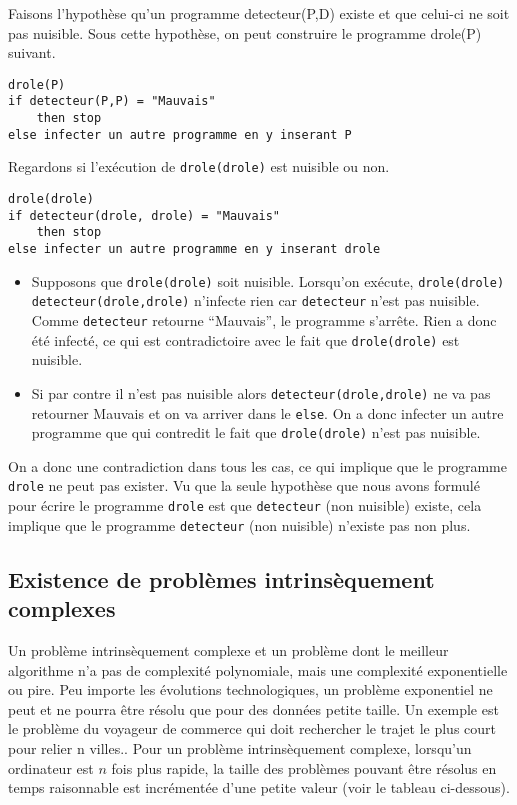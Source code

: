 Faisons l'hypothèse qu'un programme detecteur(P,D) existe et que celui-ci ne soit pas nuisible.  Sous cette hypothèse, on peut construire le programme  drole(P) suivant.

\label{lst:detecteur_de_virus}
\begin{lstlisting}
drole(P)
if detecteur(P,P) = "Mauvais"
	then stop
else infecter un autre programme en y inserant P
\end{lstlisting}

Regardons si l'exécution de \lstinline|drole(drole)| est nuisible ou non.  
\begin{lstlisting}
drole(drole)
if detecteur(drole, drole) = "Mauvais"
	then stop
else infecter un autre programme en y inserant drole
\end{lstlisting}

\begin{itemize}
	\item Supposons que \lstinline|drole(drole)| soit nuisible.
      Lorsqu'on exécute, \lstinline|drole(drole)|
      \lstinline|detecteur(drole,drole)| n'infecte rien car \lstinline|detecteur| n'est pas nuisible.
      Comme \lstinline|detecteur| retourne ``Mauvais'',
      le programme s'arrête.
      Rien a donc été infecté, ce qui est contradictoire avec le fait que \lstinline|drole(drole)| est nuisible.
	\item Si par contre il n'est pas nuisible alors \lstinline|detecteur(drole,drole)|
      ne va pas retourner Mauvais et on va arriver dans le \lstinline|else|.
      On a donc infecter un autre programme que qui contredit le fait que \lstinline|drole(drole)| n'est pas nuisible.
\end{itemize}

On a donc une contradiction dans tous les cas, ce qui implique que le programme \lstinline|drole| ne peut pas
exister. Vu que la seule hypothèse que nous avons formulé pour écrire le programme \lstinline|drole| est que \lstinline|detecteur| (non nuisible) existe, 
cela implique que le programme \lstinline|detecteur| (non nuisible) n'existe pas non plus.

\subsection{ Existence de problèmes intrinsèquement complexes}
\label{subsec:existence_de_problemes_intrinsequement_complexes}

Un problème intrinsèquement complexe et un problème dont le meilleur algorithme n'a pas de complexité polynomiale, mais une complexité exponentielle ou pire.  Peu importe les évolutions technologiques, un problème exponentiel ne peut et ne pourra être résolu que pour des données petite taille.  Un exemple est le problème du voyageur de commerce qui doit rechercher le trajet le plus court pour relier n villes..  Pour un problème intrinsèquement complexe, lorsqu'un ordinateur est $n$ fois plus rapide,  la taille des problèmes pouvant être résolus en temps raisonnable est incrémentée d'une petite valeur (voir le tableau ci-dessous).

